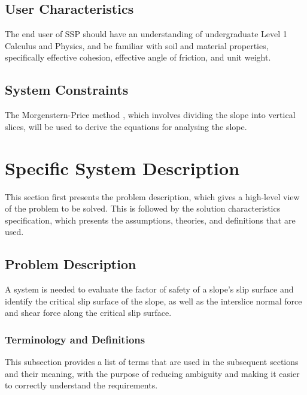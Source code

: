 \documentclass[12pt]{article}
\begin{document}
\subsection{User Characteristics}
\label{Sec:UserChars}
The end user of SSP should have an understanding of undergraduate Level 1 Calculus and Physics, and be familiar with soil and material properties, specifically effective cohesion, effective angle of friction, and unit weight.

\subsection{System Constraints}
\label{Sec:SysConstraints}
The Morgenstern-Price method \cite{morgenstern1965}, which involves dividing the slope into vertical slices, will be used to derive the equations for analysing the slope.

\section{Specific System Description}
\label{Sec:SpecSystDesc}
This section first presents the problem description, which gives a high-level view of the problem to be solved. This is followed by the solution characteristics specification, which presents the assumptions, theories, and definitions that are used.

\subsection{Problem Description}
\label{Sec:ProbDesc}
A system is needed to evaluate the factor of safety of a slope's slip surface and identify the critical slip surface of the slope, as well as the interslice normal force and shear force along the critical slip surface.

\subsubsection{Terminology and Definitions}
\label{Sec:TermDefs}
This subsection provides a list of terms that are used in the subsequent sections and their meaning, with the purpose of reducing ambiguity and making it easier to correctly understand the requirements.
\end{document}
